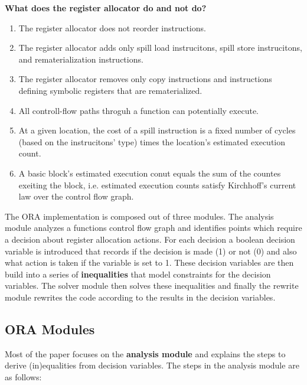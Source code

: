 \documentclass[a4paper,10pt]{article}
\begin{document}
\noindent \textbf{What does the register allocator do and not do?}
\begin{enumerate}
 \item The register allocator does not reorder instructions.
 \item The register allocator adds only spill load instrucitons, spill store instrucitons, and rematerialization instructions.
 \item The register allocator removes only copy instructions and instructions defining symbolic registers that are rematerialized.
 \item All controll-flow paths throguh a function can potentially execute.
 \item At a given location, the cost of a spill instruction is a fixed number of cycles (based on the instrucitons' type) times the
       location's estimated execution count.
 \item A basic block's estimated execution conut equals the sum of the countes exeiting the block, i.e. estimated execution counts
       satisfy Kirchhoff's current law over the control flow graph.
\end{enumerate}

The ORA implementation is composed out of three modules. The analysis module analyzes a functions control flow graph and identifies
points which require a decision about register allocation actions. For each decision a boolean decision variable is introduced that
records if the decision is made (1) or not (0) and also what action is taken if the variable is set to 1. These decision variables are
then build into a series of \textbf{inequalities} that model constraints for the decision variables. The solver module then solves these
inequalities and finally the rewrite module rewrites the code according to the results in the decision variables.

\subsection{ORA Modules}
Most of the paper focuses on the \textbf{analysis module} and explains the steps to derive (in)equalities from decision variables. The
steps in the analysis module are as follows:
\end{document}
